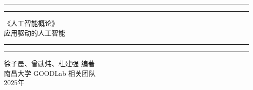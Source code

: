 \begin{titlepage}
	\centering %
	\scshape %
	\vspace*{1.5\baselineskip} %

	\rule{13cm}{1.6pt}\vspace*{-\baselineskip}\vspace*{2pt} %
	\rule{13cm}{0.4pt} %
	
		\vspace{0.75\baselineskip} %
	{	
		\Huge 《人工智能概论》 \\
		\Large 应用驱动的人工智能 \\	
    }
		\vspace{0.75\baselineskip} %
	\rule{13cm}{0.4pt}\vspace*{-\baselineskip}\vspace{3.2pt} %
	\rule{13cm}{1.6pt} %
	
		\vspace{1.75\baselineskip} %
	{\large 徐子晨、曾勋炜、杜建强 编著 \\
		\vspace*{0.6\baselineskip}
	南昌大学 GOODLab 相关团队 \\
		\vspace*{1.2\baselineskip}
	2025年} \\
	\vfill

\end{titlepage}
